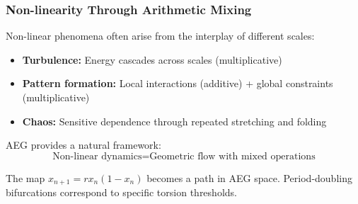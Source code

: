 \documentclass[aspectratio=169]{beamer}
\begin{document}
\begin{frame}
    \frametitle{Non-linearity Through Arithmetic Mixing}
    Non-linear phenomena often arise from the interplay of different scales:
    
    \begin{itemize}
        \item \textbf{Turbulence:} Energy cascades across scales (multiplicative)
        \item \textbf{Pattern formation:} Local interactions (additive) + global constraints (multiplicative)
        \item \textbf{Chaos:} Sensitive dependence through repeated stretching and folding
    \end{itemize}
    
    AEG provides a natural framework:
    \[
        \text{Non-linear dynamics} = \text{Geometric flow with mixed operations}
    \]
    
    \begin{example}
    The map $x_{n+1} = rx_n(1-x_n)$ becomes a path in AEG space. Period-doubling bifurcations correspond to specific torsion thresholds.
    \end{example}
\end{frame}
\end{document}
